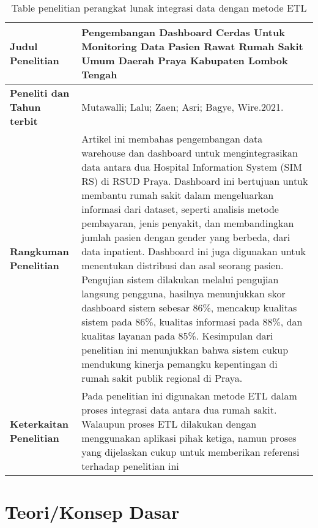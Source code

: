 \clearpage

\begin{table}[ht]
  \caption{Table penelitian perangkat lunak integrasi data dengan metode ETL}
  \label{tab:penelitian-terdahulu-2}
  \centering
  \begin{tabularx}{\textwidth}{|p{3.5cm}|X|}
    \hline
    \textbf{Judul Penelitian} & Pengembangan Dashboard Cerdas Untuk Monitoring Data Pasien Rawat Rumah Sakit Umum Daerah Praya Kabupaten Lombok Tengah \\
    \hline
    \textbf{Peneliti dan Tahun terbit} & Mutawalli; Lalu; Zaen; Asri; Bagye, Wire.2021. \\
    \hline
    \textbf{Rangkuman Penelitian} & Artikel ini membahas pengembangan data warehouse dan dashboard untuk mengintegrasikan data antara dua Hospital Information System (SIM RS) di RSUD Praya. Dashboard ini bertujuan untuk membantu rumah sakit dalam mengeluarkan informasi dari dataset, seperti analisis metode pembayaran, jenis penyakit, dan membandingkan jumlah pasien dengan gender yang berbeda, dari data inpatient. Dashboard ini juga digunakan untuk menentukan distribusi dan asal seorang pasien. Pengujian sistem dilakukan melalui pengujian langsung pengguna, hasilnya menunjukkan skor dashboard sistem sebesar 86\%, mencakup kualitas sistem pada 86\%, kualitas informasi pada 88\%, dan kualitas layanan pada 85\%. Kesimpulan dari penelitian ini menunjukkan bahwa sistem cukup mendukung kinerja pemangku kepentingan di rumah sakit publik regional di Praya.\\
    \hline
    \textbf{Keterkaitan Penelitian} & Pada penelitian ini digunakan metode ETL dalam proses integrasi data antara dua rumah sakit. Walaupun proses ETL dilakukan dengan menggunakan aplikasi pihak ketiga, namun proses yang dijelaskan cukup untuk memberikan referensi terhadap penelitian ini \\
    \hline
  \end{tabularx}
\end{table}

\clearpage

\section{Teori/Konsep Dasar}

